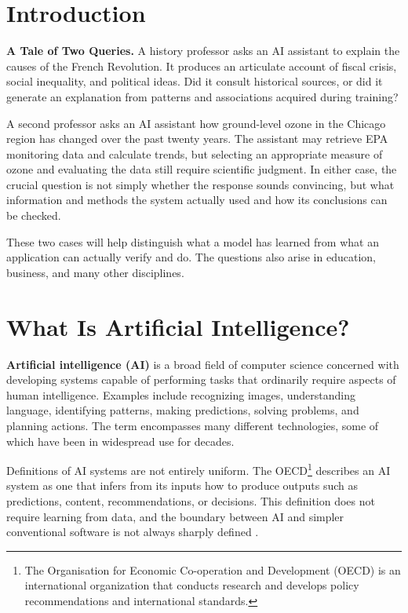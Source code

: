\documentclass[11pt]{article}
\begin{document}
\section*{Introduction}

\noindent\textbf{A Tale of Two Queries.}
A history professor asks an AI assistant to explain the causes of the
French Revolution. It produces an articulate account of fiscal crisis,
social inequality, and political ideas. Did it consult historical sources,
or did it generate an explanation from patterns and associations acquired during training?

A second professor asks an AI assistant how ground-level ozone in the Chicago region
has changed over the past twenty years.
The assistant may retrieve EPA monitoring data and calculate trends, but selecting an appropriate measure of ozone and evaluating the data still require scientific judgment. In either case, the crucial question is not simply whether the response sounds convincing, but what information and methods the system actually used and how its conclusions can be checked.

These two cases will help distinguish what a model has learned from
what an application can actually verify and do. The questions also
arise in education, business, and many other disciplines.

\section{What Is Artificial Intelligence?}

\textbf{Artificial intelligence (AI)} is a broad field of computer
science concerned with developing systems capable of performing tasks
that ordinarily require aspects of human intelligence. Examples include
recognizing images, understanding language, identifying patterns,
making predictions, solving problems, and planning actions. The term
encompasses many different technologies, some of which have been in
widespread use for decades.

Definitions of AI systems are not entirely uniform. The 
OECD\footnote{The Organisation for Economic Co-operation and
Development (OECD) is an international organization that conducts
research and develops policy recommendations and international
standards.}
describes an AI system as one that infers from its inputs how to produce outputs
such as predictions, content, recommendations, or decisions. This
definition does not require learning from data, and the boundary between
AI and simpler conventional software is not always sharply defined
\citep{OECD2024AIDefinition}.
\end{document}
